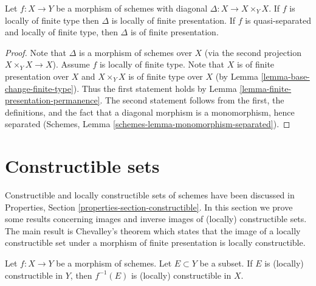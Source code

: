 \begin{lemma}
\label{lemma-diagonal-morphism-finite-type}
Let $f : X \to Y$ be a morphism of schemes with diagonal
$\Delta : X \to X \times_Y X$. If $f$ is locally of finite type
then $\Delta$ is locally of finite presentation. If $f$ is quasi-separated
and locally of finite type, then $\Delta$ is of finite presentation.
\end{lemma}

\begin{proof}
Note that $\Delta$ is a morphism of schemes over $X$ (via the second
projection $X \times_Y X \to X$). Assume $f$ is locally of finite type.
Note that $X$ is of finite presentation over $X$ and $X \times_Y X$ is
of finite type over $X$ (by Lemma \ref{lemma-base-change-finite-type}).
Thus the first statement holds by
Lemma \ref{lemma-finite-presentation-permanence}.
The second statement follows from the first, the definitions, and
the fact that a diagonal morphism is a monomorphism, hence separated
(Schemes, Lemma \ref{schemes-lemma-monomorphism-separated}).
\end{proof}








\section{Constructible sets}
\label{section-constructible}

\noindent
Constructible and locally constructible sets of schemes have been discussed in
Properties, Section \ref{properties-section-constructible}.
In this section we prove some results concerning images and inverse images
of (locally) constructible sets. The main result is Chevalley's theorem
which states that the image of a locally constructible set under a morphism
of finite presentation is locally constructible.

\begin{lemma}
\label{lemma-inverse-image-constructible}
Let $f : X \to Y$ be a morphism of schemes.
Let $E \subset Y$ be a subset.
If $E$ is (locally) constructible in $Y$, then $f^{-1}(E)$ is (locally)
constructible in $X$.
\end{lemma}

